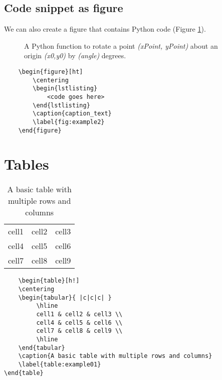 \documentclass[../main.tex]{subfiles}
\begin{document}
\subsection{Code snippet as figure}
We can also create a figure that contains Python code (Figure \ref{fig:example2}).

	\begin{figure}[ht]
		\centering
        
    	\caption{A Python function to rotate a point \textit{(xPoint, yPoint)} about an origin \textit{(x0,y0)} by \textit{(angle)} degrees.}
    	\label{fig:example2}
	\end{figure}

\begin{verbatim}
	\begin{figure}[ht]
    	\centering
        \begin{lstlisting}
		    <code goes here>
		\end{lstlisting}
    	\caption{caption_text}
    	\label{fig:example2}
	\end{figure}
\end{verbatim}

\section{Tables}
\begin{table}[ht]
    \centering
    \begin{tabular}{ |c|c|c| } 
         \hline
         cell1 & cell2 & cell3 \\ 
         cell4 & cell5 & cell6 \\ 
         cell7 & cell8 & cell9 \\ 
         \hline
    \end{tabular}
    \caption{A basic table with multiple rows and columns}
    \label{table:example01}
\end{table}
\begin{verbatim}
    \begin{table}[h!]
    \centering
    \begin{tabular}{ |c|c|c| } 
         \hline
         cell1 & cell2 & cell3 \\ 
         cell4 & cell5 & cell6 \\ 
         cell7 & cell8 & cell9 \\ 
         \hline
    \end{tabular}
    \caption{A basic table with multiple rows and columns}
    \label{table:example01}
\end{table}
\end{verbatim}
\end{document}
